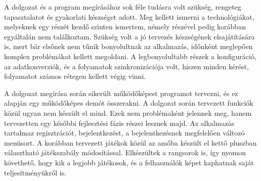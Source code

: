 


A dolgozat és a program megírásához sok féle tudásra volt szükség, rengeteg tapasztalatot és gyakorlati készséget adott. Meg kellett ismerni a technológiákat, melyeknek egy részét kezdő szinten ismertem, némely részével pedig korábban egyáltalán nem találkoztam. Szükség volt a jó tervezés készségének elsajátítására is, mert bár elsőnek nem tűnik bonyolultnak az alkalmazás, időnként meglepően komplex problémákat kellett megoldani. A legbonyolultabb részek a konfiguráció, az adatkonverziók, és a folyamatok szinkronizációja volt, hiszen minden kérést, folyamatot számos rétegen kellett végig vinni. 

A dolgozat megírása során sikerült működőképest programot tervezni, és ez alapján egy működőképes demót összerakni. A dolgozat során tervezett funkciók közül ugyan nem készült el mind. Ezek nem problémaként jelennek meg, hanem tervezetten egy későbbi fejlesztési fázis részei lesznek majd.
Az alkalmazás tartalmaz regisztrációt, bejelentkezést, a bejelentkezésnek megfelelően változó menüsort. A korábban tervezett játékok közül az amőba készült el kettő pluszban választható játékszabály módosítással. Elkészültek a rangsorok is, így nyomon követhető, hogy kik a legjobb játékosok, és a felhasználók képet kaphatnak saját teljesítményükről is.







